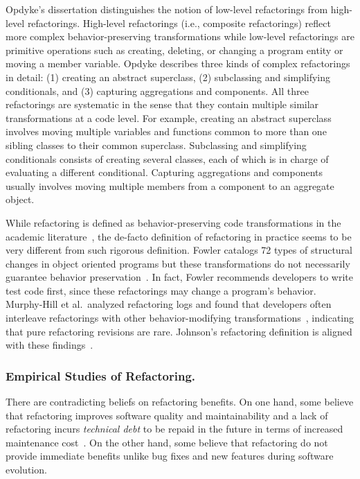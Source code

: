 Opdyke's dissertation \cite{Opdyke1992:ROF} distinguishes the notion of low-level refactorings from high-level refactorings. High-level refactorings (i.e., composite refactorings) reflect more complex behavior-preserving transformations while low-level refactorings are primitive operations such as creating, deleting, or changing a program entity or moving a member variable. Opdyke describes three kinds of complex refactorings in detail: (1) creating an abstract superclass, (2) subclassing and simplifying conditionals, and (3) capturing aggregations and components. All three refactorings are systematic in the sense that they contain multiple similar transformations at a code level. For example, {creating an abstract superclass} involves moving multiple variables and functions common to more than one sibling classes to their common superclass.  {Subclassing and simplifying conditionals} consists of creating  several classes, each of which is in charge of evaluating a different conditional. Capturing aggregations and components usually involves moving {multiple} members from a component to an aggregate object. 

While refactoring is defined as behavior-preserving code transformations in the academic literature~\cite{Mens2004:SSR}, the de-facto definition of refactoring in practice seems to be very different from such rigorous definition. Fowler catalogs 72 types of structural changes in object oriented programs but these transformations do not necessarily guarantee behavior preservation~\cite{1999:RID}. In fact, Fowler recommends developers to write test code first, since these refactorings may change a program's behavior. Murphy-Hill et al.~analyzed refactoring logs and found that developers often interleave refactorings with other behavior-modifying transformations~\cite{Murphy-Hill2012:refactor}, indicating that pure refactoring revisions are rare. Johnson's refactoring definition is aligned with these findings~\cite{Johnson2011}.

\subsubsection{Empirical Studies of Refactoring.} 
\label{sec:refactoringstudies} 
There are contradicting beliefs on refactoring benefits. On one hand, some believe that refactoring improves software quality and maintainability and a lack of refactoring incurs {\em technical debt} to be repaid in the future in terms of increased maintenance cost~\cite{Brown2010:MTD}. On the other hand, some believe that refactoring do not provide immediate benefits unlike bug fixes and new features during software evolution. 


